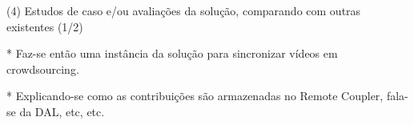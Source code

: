 (4) Estudos de caso e/ou avaliações da solução, comparando com outras existentes (1/2)

* Faz-se então uma instância da solução para sincronizar vídeos em crowdsourcing. 

* Explicando-se como as contribuições são armazenadas no Remote Coupler, fala-se da DAL, etc, etc.

